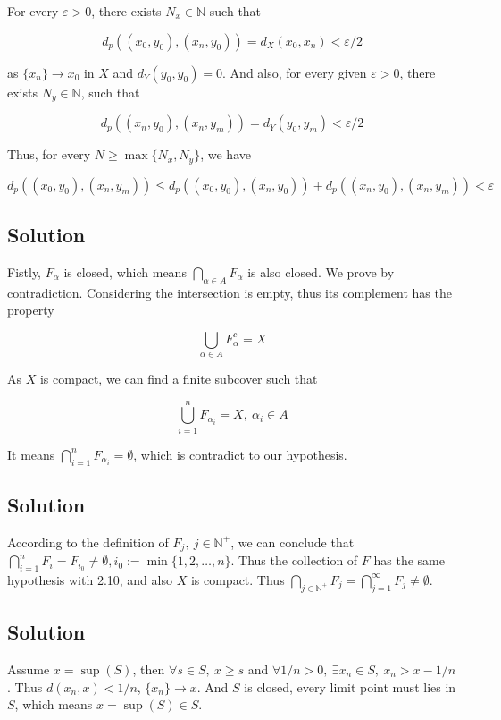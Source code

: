\documentclass{article}
\begin{document}
For every \(\varepsilon > 0\), there exists \(N_x \in \mathbb N\) such that

\[d_p((x_0, y_0), (x_n, y_0)) = d_X(x_0, x_n) < \varepsilon/2\]

as \(\{x_n\} \to x_0\) in \(X\) and \(d_Y(y_0, y_0) = 0\). And also, for every given \(\varepsilon > 0\), there exists \(N_y \in \mathbb N\), such that

\[d_p((x_n, y_0), (x_n, y_m)) = d_Y(y_0, y_m) < \varepsilon/2 \] 

Thus, for every \(N \ge \max\{N_x, N_y\}\), we have 

\[d_p((x_0, y_0), (x_n, y_m)) \le d_p((x_0, y_0), (x_n, y_0)) + d_p((x_n, y_0), (x_n, y_m)) < \varepsilon\]

\subsection{Solution}

Fistly, \(F_\alpha\) is closed, which means \(\bigcap_{\alpha \in A} F_\alpha\) is also closed. We prove by contradiction. Considering the intersection is empty, thus its complement has the property

\[\bigcup_{\alpha \in A}F_\alpha^c = X\]

As \(X\) is compact, we can find a finite subcover such that

\[\bigcup_{i = 1}^n F_{\alpha_i} = X,\ \alpha_i \in A\]

It means \(\bigcap_{i = 1}^n F_{\alpha_i} = \emptyset\), which is contradict to our hypothesis.

\subsection{Solution}

According to the definition of \(F_j,\ j \in \mathbb N^+\), we can conclude that \(\bigcap_{i = 1}^n F_i = F_{i_0} \ne \emptyset, i_0 := \min\{1, 2, \ldots, n\}\). Thus the collection of \(F\) has the same hypothesis with 2.10, and also \(X\) is compact. Thus \(\bigcap_{j \in \mathbb N^+} F_j = \bigcap_{j = 1}^\infty F_j \ne \emptyset\).

\subsection{Solution}

Assume \(x = \sup(S)\), then \(\forall s \in S,\ x \ge s\) and \(\forall 1/n > 0,\ \exists x_n \in S,\ x_n > x - 1/n\). Thus \(d(x_n, x) < 1/n\), \(\{x_n\} \to x\). And \(S\) is closed, every limit point must lies in \(S\), which means \(x = \sup(S) \in S\).
\end{document}
